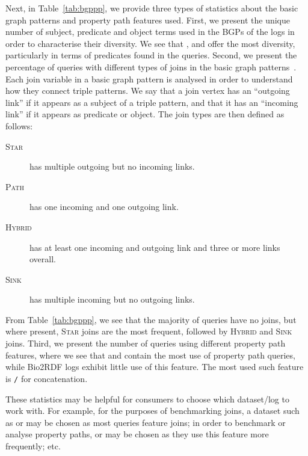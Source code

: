 Next, in Table~\ref{tab:bgppp}, we provide three types of statistics about the basic graph patterns and property path features used. First, we present the unique number of subject, predicate and object terms used in the BGPs of the logs in order to characterise their diversity. We see that \dbpedia, \linkedgeodata and \wikidata offer the most diversity, particularly in terms of predicates found in the queries. Second, we present the percentage of queries with different types of joins in the basic graph patterns~\cite{SaleemN14}. Each join variable in a basic graph pattern is analysed in order to understand how they connect triple patterns. We say that a join vertex has an ``outgoing link'' if it appears as a subject of a triple pattern, and that it has an ``incoming link'' if it appears as predicate or object. The join types are then defined as follows:
\begin{description}
\item[{\textsc{Star}}] has multiple outgoing but no incoming links.
\item[{\textsc{Path}}] has one incoming and one outgoing link.
\item[{\textsc{Hybrid}}] has at least one incoming and outgoing link and three or more links overall.
\item[{\textsc{Sink}}] has multiple incoming but no outgoing links.
\end{description}
\noindent
From Table~\ref{tab:bgppp}, we see that the majority of queries have no joins, but where present, \textsc{Star} joins are the most frequent, followed by  \textsc{Hybrid} and \textsc{Sink} joins. Third, we present the number of queries using different property path features, where we see that \dbpedia and \wikidata contain the most use of property path queries, while Bio2RDF logs exhibit little use of this feature. The most used such feature is \texttt{/} for concatenation.

These statistics may be helpful for consumers to choose which dataset/log to work with. For example, for the purposes of benchmarking joins, a dataset such as \linkedgeodata or \wikidata may be chosen as most queries feature joins; in order to benchmark or analyse property paths, \dbpedia or \wikidata may be chosen as they use this feature more frequently; etc. 



